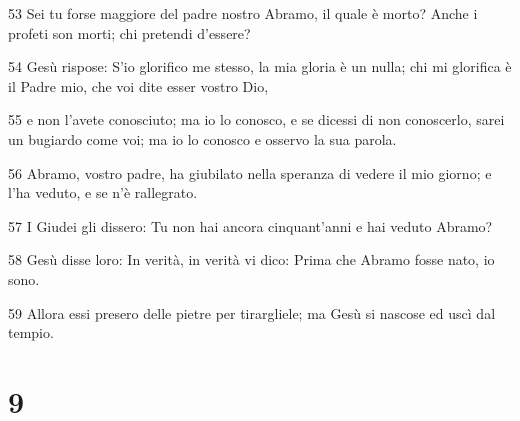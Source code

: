 \par 53 Sei tu forse maggiore del padre nostro Abramo, il quale è morto? Anche i profeti son morti; chi pretendi d'essere?
\par 54 Gesù rispose: S'io glorifico me stesso, la mia gloria è un nulla; chi mi glorifica è il Padre mio, che voi dite esser vostro Dio,
\par 55 e non l'avete conosciuto; ma io lo conosco, e se dicessi di non conoscerlo, sarei un bugiardo come voi; ma io lo conosco e osservo la sua parola.
\par 56 Abramo, vostro padre, ha giubilato nella speranza di vedere il mio giorno; e l'ha veduto, e se n'è rallegrato.
\par 57 I Giudei gli dissero: Tu non hai ancora cinquant'anni e hai veduto Abramo?
\par 58 Gesù disse loro: In verità, in verità vi dico: Prima che Abramo fosse nato, io sono.
\par 59 Allora essi presero delle pietre per tirargliele; ma Gesù si nascose ed uscì dal tempio.

\chapter{9}

